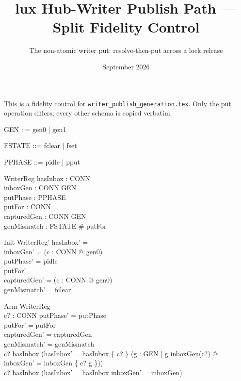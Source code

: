 \documentclass[a4paper,10pt,fleqn]{article}
\begin{document}
\title{lux Hub-Writer Publish Path --- Split Fidelity Control}
\author{The non-atomic writer put: resolve-then-put across a lock release}
\date{September 2026}
\maketitle

This is a fidelity control for \texttt{writer\_publish\_generation.tex}.
Only the put operation differs; every other schema is copied verbatim.

\begin{zed}
  [CONN]
\end{zed}

\begin{zed}
  GEN ::= gen0 | gen1
\end{zed}

\begin{zed}
  FSTATE ::= fclear | fset
\end{zed}

\begin{zed}
  PPHASE ::= pidle | pput
\end{zed}

\begin{schema}{WriterReg}
  hasInbox : \power CONN \\
  inboxGen : CONN \fun GEN \\
  putPhase : PPHASE \\
  putFor : \power CONN \\
  capturedGen : CONN \fun GEN \\
  genMismatch : FSTATE
\where
  \# putFor 
\end{schema}

\begin{schema}{Init}
  WriterReg'
\where
  hasInbox' = \emptyset \\
  inboxGen' = (\lambda c : CONN @ gen0) \\
  putPhase' = pidle \\
  putFor' = \emptyset \\
  capturedGen' = (\lambda c : CONN @ gen0) \\
  genMismatch' = fclear
\end{schema}

\begin{schema}{Arm}
  \Delta WriterReg \\
  c? : CONN
\where
  putPhase' = putPhase \\
  putFor' = putFor \\
  capturedGen' = capturedGen \\
  genMismatch' = genMismatch \\
  c? \notin hasInbox \implies
    (hasInbox' = hasInbox \cup \{ c? \} \land
     (\exists g : GEN | g \neq inboxGen(c?) @
       inboxGen' = inboxGen \oplus \{ c? \mapsto g \})) \\
  c? \in hasInbox \implies
    (hasInbox' = hasInbox \land inboxGen' = inboxGen)
\end{schema}
\end{document}
